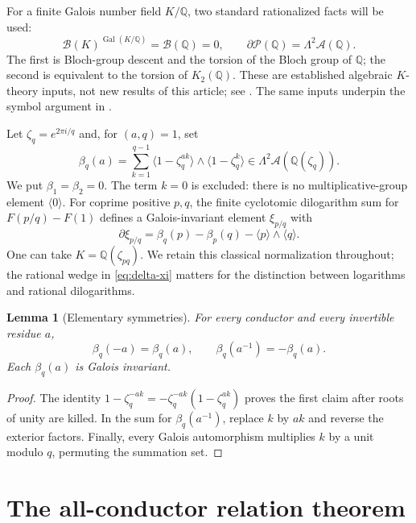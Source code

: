 \documentclass[11pt]{article}
\numberwithin{equation}{section}
\newtheorem{lemma}[theorem]{Lemma}
\theoremstyle{definition}
\theoremstyle{remark}
\newcommand{\Q}{\mathbb Q}
\newcommand{\Pcal}{\mathcal P}
\newcommand{\Bcal}{\mathcal B}
\newcommand{\Acal}{\mathcal A}
\newcommand{\cl}[1]{\langle #1\rangle}
\DeclareMathOperator{\Gal}{Gal}
\begin{document}
For a finite Galois number field $K/\Q$, two standard rationalized facts
will be used:
\begin{equation}\label{eq:bloch-facts}
 \Bcal(K)^{\Gal(K/\Q)}=\Bcal(\Q)=0,
 \qquad \partial\Pcal(\Q)=\Lambda^2\Acal(\Q).
\end{equation}
The first is Bloch-group descent and the torsion of the Bloch group of
$\Q$; the second is equivalent to the torsion of $K_2(\Q)$.
These are established algebraic $K$-theory inputs, not new results of this
article; see \cite{Milnor,ZagierDilog}. The same inputs underpin the
symbol argument in \cite[\S7.2]{RZ}.

Let $\zeta_q=e^{2\pi i/q}$ and, for $(a,q)=1$, set
\begin{equation}\label{eq:beta}
 \beta_q(a)=\sum_{k=1}^{q-1}
 \cl{1-\zeta_q^{ak}}\wedge\cl{1-\zeta_q^k}
 \in\Lambda^2\Acal(\Q(\zeta_q)).
\end{equation}
We put $\beta_1=\beta_2=0$. The term $k=0$ is excluded:
there is no multiplicative-group element $\cl0$.
For coprime positive $p,q$, the finite cyclotomic dilogarithm sum for
$F(p/q)-F(1)$ defines a Galois-invariant element $\xi_{p/q}$ with
\begin{equation}\label{eq:delta-xi}
 \partial\xi_{p/q}=\beta_q(p)-\beta_p(q)-\cl p\wedge\cl q.
\end{equation}
One can take $K=\Q(\zeta_{pq})$. We retain this classical normalization
throughout; the rational wedge in \eqref{eq:delta-xi} matters for the
distinction between logarithms and rational dilogarithms.

\begin{lemma}[Elementary symmetries]\label{lem:symmetry}
For every conductor and every invertible residue $a$,
\[
 \beta_q(-a)=\beta_q(a),\qquad
 \beta_q(a^{-1})=-\beta_q(a).
\]
Each $\beta_q(a)$ is Galois invariant.
\end{lemma}
\begin{proof}
The identity $1-\zeta_q^{-ak}=-\zeta_q^{-ak}(1-\zeta_q^{ak})$
proves the first claim after roots of unity are killed. In the sum for
$\beta_q(a^{-1})$, replace $k$ by $ak$ and reverse the exterior factors.
Finally, every Galois automorphism multiplies $k$ by a unit modulo $q$,
permuting the summation set.
\end{proof}

\section{The all-conductor relation theorem}
\label{sec:rank}
\end{document}
